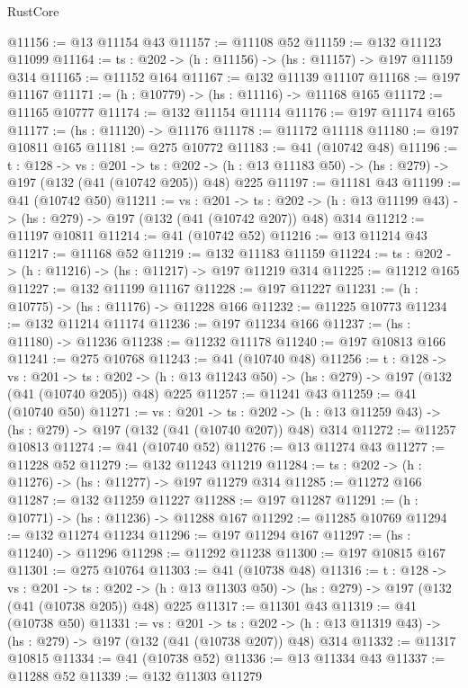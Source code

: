 \begin{lexlean}{RustCore}
\begin{coremodule}
@11156 := @13 @11154 @43
@11157 := @11108 @52
@11159 := @132 @11123 @11099
@11164 := {ts : @202} -> (h : @11156) -> (hs : @11157) -> @197 @11159 @314
@11165 := @11152 @164
@11167 := @132 @11139 @11107
@11168 := @197 @11167
@11171 := (h : @10779) -> (hs : @11116) -> @11168 @165
@11172 := @11165 @10777
@11174 := @132 @11154 @11114
@11176 := @197 @11174 @165
@11177 := (hs : @11120) -> @11176
@11178 := @11172 @11118
@11180 := @197 @10811 @165
@11181 := @275 @10772
@11183 := @41 (@10742 @48)
@11196 := {t : @128} ->
  {vs : @201} ->
  {ts : @202} -> (h : @13 @11183 @50) -> (hs : @279) -> @197 (@132 (@41 (@10742 @205)) @48) @225
@11197 := @11181 @43
@11199 := @41 (@10742 @50)
@11211 := {vs : @201} ->
  {ts : @202} -> (h : @13 @11199 @43) -> (hs : @279) -> @197 (@132 (@41 (@10742 @207)) @48) @314
@11212 := @11197 @10811
@11214 := @41 (@10742 @52)
@11216 := @13 @11214 @43
@11217 := @11168 @52
@11219 := @132 @11183 @11159
@11224 := {ts : @202} -> (h : @11216) -> (hs : @11217) -> @197 @11219 @314
@11225 := @11212 @165
@11227 := @132 @11199 @11167
@11228 := @197 @11227
@11231 := (h : @10775) -> (hs : @11176) -> @11228 @166
@11232 := @11225 @10773
@11234 := @132 @11214 @11174
@11236 := @197 @11234 @166
@11237 := (hs : @11180) -> @11236
@11238 := @11232 @11178
@11240 := @197 @10813 @166
@11241 := @275 @10768
@11243 := @41 (@10740 @48)
@11256 := {t : @128} ->
  {vs : @201} ->
  {ts : @202} -> (h : @13 @11243 @50) -> (hs : @279) -> @197 (@132 (@41 (@10740 @205)) @48) @225
@11257 := @11241 @43
@11259 := @41 (@10740 @50)
@11271 := {vs : @201} ->
  {ts : @202} -> (h : @13 @11259 @43) -> (hs : @279) -> @197 (@132 (@41 (@10740 @207)) @48) @314
@11272 := @11257 @10813
@11274 := @41 (@10740 @52)
@11276 := @13 @11274 @43
@11277 := @11228 @52
@11279 := @132 @11243 @11219
@11284 := {ts : @202} -> (h : @11276) -> (hs : @11277) -> @197 @11279 @314
@11285 := @11272 @166
@11287 := @132 @11259 @11227
@11288 := @197 @11287
@11291 := (h : @10771) -> (hs : @11236) -> @11288 @167
@11292 := @11285 @10769
@11294 := @132 @11274 @11234
@11296 := @197 @11294 @167
@11297 := (hs : @11240) -> @11296
@11298 := @11292 @11238
@11300 := @197 @10815 @167
@11301 := @275 @10764
@11303 := @41 (@10738 @48)
@11316 := {t : @128} ->
  {vs : @201} ->
  {ts : @202} -> (h : @13 @11303 @50) -> (hs : @279) -> @197 (@132 (@41 (@10738 @205)) @48) @225
@11317 := @11301 @43
@11319 := @41 (@10738 @50)
@11331 := {vs : @201} ->
  {ts : @202} -> (h : @13 @11319 @43) -> (hs : @279) -> @197 (@132 (@41 (@10738 @207)) @48) @314
@11332 := @11317 @10815
@11334 := @41 (@10738 @52)
@11336 := @13 @11334 @43
@11337 := @11288 @52
@11339 := @132 @11303 @11279

\end{coremodule}
\end{lexlean}
